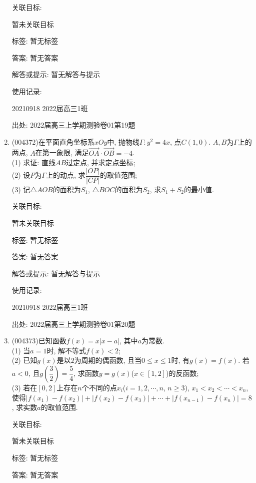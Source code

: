 \documentclass[10pt,a4paper]{article}
\begin{document}
\begin{enumerate}[1.]
关联目标:

暂未关联目标



标签: 暂无标签

答案: 暂无答案

解答或提示: 暂无解答与提示

使用记录:

20210918	2022届高三1班		


出处: 2022届高三上学期测验卷01第19题
\item { (004372)}在平面直角坐标系$xOy$中, 抛物线$\Gamma:y^2=4x$, 点$C(1,0)$. $A,B$为$\Gamma$上的两点, $A$在第一象限, 满足$\overrightarrow{OA}\cdot \overrightarrow{OB}=-4$.\\
(1) 求证: 直线$AB$过定点, 并求定点坐标;\\
(2) 设$P$为$\Gamma$上的动点, 求$\dfrac{|OP|}{|CP|}$的取值范围;\\
(3) 记$\triangle AOB$的面积为$S_1$, $\triangle BOC$的面积为$S_2$, 求$S_1+S_2$的最小值.


关联目标:

暂未关联目标



标签: 暂无标签

答案: 暂无答案

解答或提示: 暂无解答与提示

使用记录:

20210918	2022届高三1班			


出处: 2022届高三上学期测验卷01第20题
\item { (004373)}已知函数$f(x)=x|x-a|$, 其中$a$为常数.\\
(1) 当$a=1$时, 解不等式$f(x)<2$;\\
(2) 已知$g(x)$是以$2$为周期的偶函数, 且当$0\le x\le 1$时, 有$g(x)=f(x)$. 若$a<0$, 且$g(\dfrac 32)=\dfrac 54$, 求函数$y=g(x)$($x\in [1,2]$)的反函数;\\
(3) 若在$[0,2]$上存在$n$个不同的点$x_i$($i=1,2,\cdots,n$, $n\ge 3$), $x_1<x_2<\cdots <x_n$, 使得$|f(x_1)-f(x_2)|+|f(x_2)-f(x_3)|+\cdots+|f(x_{n-1})-f(x_n)|=8$, 求实数$a$的取值范围.


关联目标:

暂未关联目标



标签: 暂无标签

答案: 暂无答案


\end{enumerate}
\end{document}
